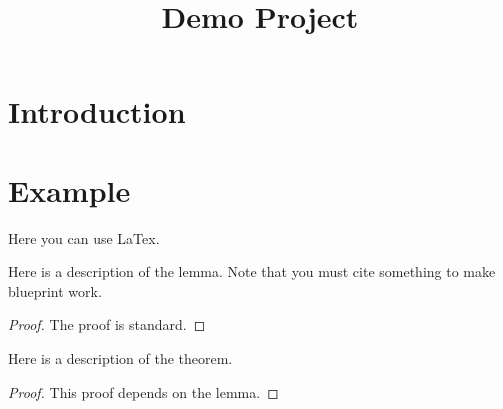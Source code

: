 \title{Demo Project}



\maketitle


\tableofcontents
\section{Introduction}



\section{Example}
Here you can use LaTex.

\begin{lemma}\label{lemma:aux}
	\leanok
	Here is a description of the lemma.\cite{Samuel} Note that you must cite something to make blueprint work.
\end{lemma}
\begin{proof}
	\leanok
	The proof is standard.
\end{proof}

\begin{theorem}\label{theorem:Ex}
	\leanok
	Here is a description of the theorem.
\end{theorem}
\begin{proof}
	\leanok
	This proof depends on the lemma.
\end{proof}
